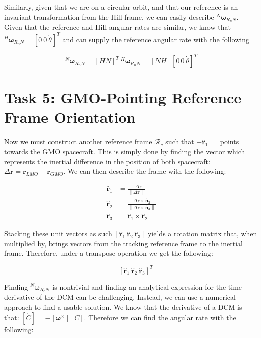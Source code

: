 \documentclass[paper]{aiaaNew}
\newcommand{\norm}[1]{\left\lVert#1\right\rVert}
\begin{document}
Similarly, given that we are on a circular orbit, and that our reference is an invariant transformation from the Hill frame, we can easily describe $^N \bm{\omega}_{R_nN}$. Given that the reference and Hill angular rates are similar, we know that $^H \bm{\omega}_{R_nN} = [0 \ 0 \ \dot{\theta}]^T$ and can supply the reference angular rate with the following


\begin{equation}
  ^N \bm{\omega}_{R_nN} = [HN]^T \ ^H \bm{\omega}_{R_nN} = [NH][0 \ 0 \ \dot{\theta}]^T
\end{equation}







\section*{Task 5: GMO-Pointing Reference Frame Orientation}
Now we must construct another reference frame $\mathcal{R}_c$ such that $-\hat{\bm{r}}_1 = $ points towards the GMO spacecraft. This is simply done by finding the vector which represents the inertial difference in the position of both spacecraft: $\Delta\bm{r} = \bm{r}_{LMO} - \bm{r}_{GMO}$. We can then describe the frame with the following:

\begin{align}
  \hat{\bm{r}}_1 &= \frac{-\Delta\bm{r}}{\norm{\Delta\bm{r}}} \\ 
  \hat{\bm{r}}_2 &= \frac{\Delta\bm{r} \times \hat{\bm{n}}_3}{\norm{\Delta\bm{r} \times \hat{\bm{n}}_3}} \\ 
  \hat{\bm{r}}_3 &= \hat{\bm{r}}_1 \times \hat{\bm{r}}_2 
\end{align}

Stacking these unit vectors as such $[\hat{\bm{r}}_1 \ \hat{\bm{r}}_2 \ \hat{\bm{r}}_3 ]$ yields a rotation matrix that, when multiplied by, brings vectors from the tracking reference frame to the inertial frame. Therefore, under a transpose operation we get the following: 

\begin{equation}
  [R_cN] = [\hat{\bm{r}}_1 \ \hat{\bm{r}}_2 \ \hat{\bm{r}}_3 ]^T
\end{equation}

Finding $^N\bm{\omega}_{R_cN}$ is nontrivial and finding an analytical expression for the time derivative of the DCM can be challenging. Instead, we can use a numerical approach to find a usable solution. We know that the derivative of a DCM is that: $[\dot{C}] = -[\bm{\omega}^\times][C]$. Therefore we can find the angular rate with the following:
\end{document}
